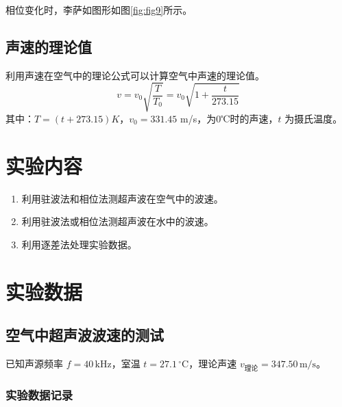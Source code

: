 \documentclass[11pt]{article}
\begin{document}
相位变化时，李萨如图形如图\ref{fig:fig9}所示。


\subsection{声速的理论值}
利用声速在空气中的理论公式可以计算空气中声速的理论值。
\begin{equation}
    v=v_{0}\sqrt{\frac{T}{T_{0}}}=v_{0}\sqrt{1+\frac{t}{273.15}}
\end{equation}
其中：$T=(t+273.15)K$，$v_{0}=331.45$ m/s，为0℃时的声速，$t$ 为摄氏温度。

\section{实验内容}
\begin{enumerate}
    \item 利用驻波法和相位法测超声波在空气中的波速。
    \item 利用驻波法或相位法测超声波在水中的波速。
    \item 利用逐差法处理实验数据。
\end{enumerate}

\section{实验数据}
\subsection{空气中超声波波速的测试}

已知声源频率 $f = 40\,\text{kHz}$，室温 $t = 27.1\,^\circ\text{C}$，理论声速 $v_{\text{理论}} = 347.50\,\text{m/s}$。

\subsubsection{实验数据记录}
\end{document}
